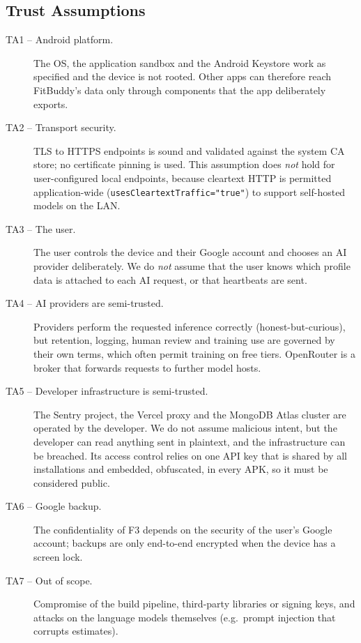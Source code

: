 \subsection{Trust Assumptions}
\begin{description}
  \item[TA1 -- Android platform.] The OS, the application sandbox and the Android Keystore work as
    specified and the device is not rooted. Other apps can therefore reach FitBuddy's data only
    through components that the app deliberately exports.
  \item[TA2 -- Transport security.] TLS to HTTPS endpoints is sound and validated against the
    system CA store; no certificate pinning is used. This assumption does \emph{not} hold for
    user-configured local endpoints, because cleartext HTTP is permitted application-wide
    (\texttt{usesCleartextTraffic="true"}) to support self-hosted models on the LAN.
  \item[TA3 -- The user.] The user controls the device and their Google account and chooses an
    AI provider deliberately. We do \emph{not} assume that the user knows which profile data is
    attached to each AI request, or that heartbeats are sent.
  \item[TA4 -- AI providers are semi-trusted.] Providers perform the requested inference correctly
    (honest-but-curious), but retention, logging, human review and training use are governed by
    their own terms, which often permit training on free tiers. OpenRouter is a broker that
    forwards requests to further model hosts.
  \item[TA5 -- Developer infrastructure is semi-trusted.] The Sentry project, the Vercel proxy and
    the MongoDB Atlas cluster are operated by the developer. We do not assume malicious intent,
    but the developer can read anything sent in plaintext, and the infrastructure can be breached.
    Its access control relies on one API key that is shared by all installations and embedded,
    obfuscated, in every APK, so it must be considered public.
  \item[TA6 -- Google backup.] The confidentiality of F3 depends on the security of the user's
    Google account; backups are only end-to-end encrypted when the device has a screen lock.
  \item[TA7 -- Out of scope.] Compromise of the build pipeline, third-party libraries or signing
    keys, and attacks on the language models themselves (e.g.\ prompt injection that corrupts
    estimates).
\end{description}

